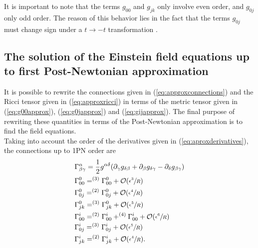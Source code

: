 It is important to note that the terms  $g_{00}$ and $g_{jk}$ only involve even order, and  $g_{0j}$ only odd order. The reason of this behavior lies in the fact that the terms $g_{0j}$ must change sign under a $t \rightarrow -t$ transformation \cite{Weinberg}.


\subsection{The solution of the Einstein field equations up to first Post-Newtonian approximation}

It is possible to rewrite the connections given in (\ref{eq:approxconnections}) and the Ricci tensor given in (\ref{eq:approxricci})  in terms of the metric tensor given in (\ref{eq:g00approx}), (\ref{eq:g0japprox}) and (\ref{eq:gijapprox}). The final purpose of rewriting these quantities in terms of the Post-Newtonian approximation is to find the field equations. \\

Taking into account the order of the derivatives given in (\ref{eq:aproxderivatives}), the connections up to 1PN order are
\begin{subequations}
\label{eq: conectionsexpansion}
\begin{align}
&\Gamma_{\beta\gamma}^{\alpha} = \frac{1}{2}g^{\alpha\delta}(\partial_{\gamma} g_{\delta \beta} + \partial_{\beta} g_{\delta \gamma} -\partial_{\delta} g_{\beta \gamma} ) \\
&\Gamma_{00}^{0} =  ^{(3)}\Gamma_{00}^{0} + \mathcal{O}(\sfrac{\epsilon ^ {3}}{R})\\
&\Gamma_{0j}^{0} = ^{(2)}\Gamma_{0j}^{0} + \mathcal{O}(\sfrac{\epsilon ^ {4}}{R}) \\
&\Gamma_{jk}^{0} = ^{(3)}\Gamma_{jk}^{0} + \mathcal{O}(\sfrac{\epsilon ^ {5}}{R}) \\
&\Gamma_{00}^{i} = ^{(2)}\Gamma_{00}^{i} + ^{(4)}\Gamma_{00}^{i} +\mathcal{O}(\sfrac{\epsilon ^ {6}}{R})\\
&\Gamma_{0j}^{i} = ^{(3)}\Gamma_{0j}^{i} + \mathcal{O}(\sfrac{\epsilon ^ {5}}{R})\\
&\Gamma_{jk}^{i} = ^{(2)}\Gamma_{jk}^{i} + \mathcal{O}(\sfrac{\epsilon ^ {4}}{R}).
\end{align}
\end{subequations}

